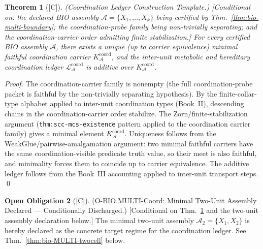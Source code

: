 \documentclass[12pt,oneside]{amsbook}
\theoremstyle{plain}
\newtheorem{theorem}{Theorem}[section]
\theoremstyle{definition}
\newtheorem{obligation}[theorem]{Open Obligation}
\theoremstyle{remark}
\newcommand{\status}[1]{\textup{[#1]}}
\begin{document}
\begin{theorem}[\status{C}]\label{thm:bio-MULTI-coord-template}
\textup{(Coordination Ledger Construction Template.)}
\textup{[Conditional on: the declared BIO assembly
$\mathcal{A} = \{X_1, \ldots, X_k\}$ being certified by
Thm.~\ref{thm:bio-multi-boundary}; the coordination-probe
family being non-trivially separating; and the
coordination-carrier order admitting finite stabilization.]}
For every certified BIO assembly $\mathcal{A}$, there exists a
unique (up to carrier equivalence) minimal faithful coordination
carrier $K^{\mathrm{coord}}_{\mathcal{A}}$, and the inter-unit
metabolic and hereditary coordination ledger
$\mathcal{L}^{\mathrm{coord}}_{\mathcal{A}}$ is additive over
$K^{\mathrm{coord}}_{\mathcal{A}}$.
\end{theorem}

\begin{proof}
The coordination-carrier family is nonempty (the full
coordination-probe packet is faithful by the non-trivially
separating hypothesis).  By the finite-collar-type alphabet
applied to inter-unit coordination types (Book~II), descending
chains in the coordination-carrier order stabilize.  The
Zorn/finite-stabilization argument (\texttt{thm:scc-mcs-existence}
pattern applied to the coordination carrier family) gives a
minimal element $K^{\mathrm{coord}}_{\mathcal{A}}$.  Uniqueness
follows from the WeakGlue/pairwise-amalgamation argument: two
minimal faithful carriers have the same coordination-visible
predicate truth value, so their meet is also faithful, and
minimality forces them to coincide up to carrier equivalence.
The additive ledger follows from the Book~III accounting
applied to inter-unit transport steps.
\qed
\end{proof}

\begin{obligation}[\status{C}]\label{ob:bio-MULTI-coord-concrete}
\textup{(O-BIO.MULTI-Coord: Minimal Two-Unit Assembly Declared ---
Conditionally Discharged.)}
\textup{[Conditional on Thm.~\ref{thm:bio-MULTI-coord-template}
and the two-unit assembly declaration below.]}
The minimal two-unit assembly $\mathcal{A}_2 = \{X_1, X_2\}$ is
hereby declared as the concrete target regime for the coordination
ledger.  See Thm.~\ref{thm:bio-MULTI-twocell} below.
\end{obligation}
\end{document}
